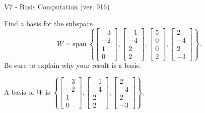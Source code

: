 \begin{exercise}
  \begin{exerciseTitle}V7 - Basis Computation (ver. 916)\end{exerciseTitle}
  \begin{exerciseStatement}
    Find a basis for the subspace 
\[W=\mathrm{span}\ \left\{\left[\begin{array}{r}
-3 \\
-2 \\
1 \\
0
\end{array}\right] , \left[\begin{array}{r}
-1 \\
-4 \\
2 \\
2
\end{array}\right] , \left[\begin{array}{r}
5 \\
0 \\
0 \\
2
\end{array}\right] , \left[\begin{array}{r}
2 \\
-4 \\
2 \\
-3
\end{array}\right]\right\}.\]
 Be sure to explain why your result is a basis.


  \end{exerciseStatement}
  \begin{exerciseAnswer}
   A basis of \(W\) is  \(\left\{\left[\begin{array}{r}
-3 \\
-2 \\
1 \\
0
\end{array}\right] , \left[\begin{array}{r}
-1 \\
-4 \\
2 \\
2
\end{array}\right] , \left[\begin{array}{r}
2 \\
-4 \\
2 \\
-3
\end{array}\right]\right\}\).
  


  \end{exerciseAnswer}
\end{exercise}